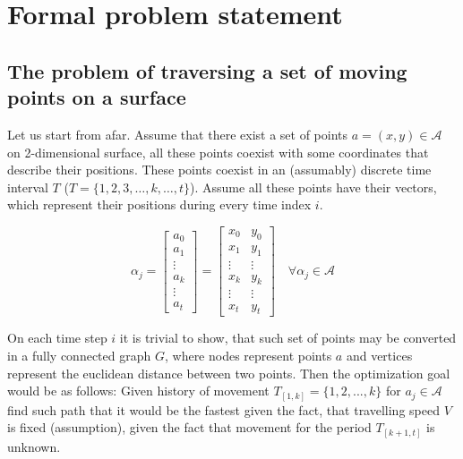 \chapter{Formal problem statement}
\label{cha:Proposal-ENG}
  
 \section{The problem of traversing a set of moving points on a surface}


\iffalse %
Let us start from afar.  Assume that there exist a set of points $a=(x,y) \in\mathcal{A}$ on 2-dimensional surface, all these points coexist with some coordinates that describe their positions. 
These points coexist in an (assumably) discrete time interval 
$T$ ($T=\{1,2,3,\dots,k,\dots,t \}$). 
Assume all these points have their vectors, which represent their positions during every time index $i$. 

$$
\alpha_{j} = \begin{bmatrix}
a_{0} \\
a_{1} \\
\vdots \\
a_{k} \\
\vdots \\
a_{t}
\end{bmatrix} = \begin{bmatrix}
x_{0}  & y_{0} \\
x_{1}  & y_{1} \\
\vdots & \vdots\\
x_{k}  & y_{k} \\
\vdots & \vdots\\
x_{t}  & y_{t}
\end{bmatrix} \quad \forall \alpha_j \in \mathcal{A}
$$

On each time step $i$ it is trivial to show, that such set of points may be converted in a fully connected graph $G$, where nodes represent points $a$ and vertices represent the euclidean distance between two points. Then the optimization goal would be as follows: Given history of movement $T_{[1,k]} = \{1,2,...,k\}$ for $a_j \in \mathcal{A}$ find such path that it would be the fastest given the fact, that travelling speed $V$ is fixed (assumption), given the fact that movement for the period $T_{[k+1, t]}$ is unknown.


